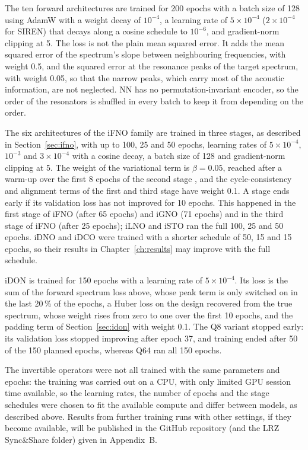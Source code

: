 The ten forward architectures are trained for 200 epochs with a batch size of 128 using AdamW \parencite{loshchilov2019adamw} with a weight decay of $10^{-4}$, a learning rate of $5\times10^{-4}$ ($2\times10^{-4}$ for SIREN) that decays along a cosine schedule to $10^{-6}$, and gradient-norm clipping at 5. The loss is not the plain mean squared error. It adds the mean squared error of the spectrum's slope between neighbouring frequencies, with weight 0.5, and the squared error at the resonance peaks of the target spectrum, with weight 0.05, so that the narrow peaks, which carry most of the acoustic information, are not neglected. NN has no permutation-invariant encoder, so the order of the resonators is shuffled in every batch to keep it from depending on the order.

The six architectures of the iFNO family are trained in three stages, as described in Section~\ref{sec:ifno}, with up to 100, 25 and 50 epochs, learning rates of $5\times10^{-4}$, $10^{-3}$ and $3\times10^{-4}$ with a cosine decay, a batch size of 128 and gradient-norm clipping at 5. The weight of the variational term is $\beta = 0.05$, reached after a warm-up over the first 8 epochs of the second stage \parencite{higgins2017betavae}, and the cycle-consistency and alignment terms of the first and third stage have weight 0.1. A stage ends early if its validation loss has not improved for 10 epochs. This happened in the first stage of iFNO (after 65 epochs) and iGNO (71 epochs) and in the third stage of iFNO (after 25 epochs); iLNO and iSTO ran the full 100, 25 and 50 epochs. iDNO and iDCO were trained with a shorter schedule of 50, 15 and 15 epochs, so their results in Chapter~\ref{ch:results} may improve with the full schedule.

iDON is trained for 150 epochs with a learning rate of $5\times10^{-4}$. Its loss is the sum of the forward spectrum loss above, whose peak term is only switched on in the last 20\,\% of the epochs, a Huber loss \parencite{huber1964robust} on the design recovered from the true spectrum, whose weight rises from zero to one over the first 10 epochs, and the padding term of Section~\ref{sec:idon} with weight 0.1. The Q8 variant stopped early: its validation loss stopped improving after epoch 37, and training ended after 50 of the 150 planned epochs, whereas Q64 ran all 150 epochs.

The invertible operators were not all trained with the same parameters and epochs: the training was carried out on a CPU, with only limited GPU session time available, so the learning rates, the number of epochs and the stage schedules were chosen to fit the available compute and differ between models, as described above. Results from further training runs with other settings, if they become available, will be published in the GitHub repository (and the LRZ Sync\&Share folder) given in Appendix~B.


